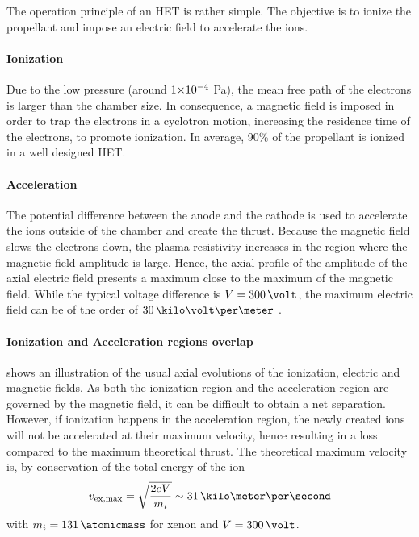   The operation principle of an \ac{HET} is rather simple.
  The objective is to ionize the propellant and impose an electric field to accelerate the ions.

  \paragraph{Ionization\\}
  Due to the low pressure (around ${{1}{\times}10^{-4}}$ Pa), the mean free path of the electrons is larger than the chamber size.
  In consequence, a magnetic field is imposed in order to trap the electrons in a cyclotron motion, increasing the residence time of the electrons, to promote  ionization.
  In average, 90\% of the propellant is ionized in a well designed \ac{HET}.

  \paragraph{Acceleration\\}
  The potential difference  between the anode and the cathode is used to accelerate the ions outside of the chamber and create the thrust.
  Because the magnetic field slows the electrons down, the plasma resistivity increases in the region where the magnetic field amplitude is large.
  Hence, the axial profile of the amplitude of the axial electric field presents a maximum close to the maximum of the magnetic field.
  While the typical voltage difference is $V=300\,\volt$, the maximum electric field can be of the order of $30\,\kilo\volt\per\meter$ \citep{gawron2008}.

  \paragraph{Ionization and Acceleration regions overlap\\}
   shows an illustration of the usual axial evolutions of the ionization, electric and magnetic fields.
  As both the ionization region and the acceleration region are governed by the magnetic field, it can be difficult to obtain a net separation.
  However, if ionization happens in the acceleration region, the newly created ions will not be accelerated at their maximum velocity, hence resulting in a loss compared to the maximum theoretical thrust.
  The theoretical maximum velocity is, by conservation of the total energy of the ion
  \begin{equation} \label{eq-vmaxtheo}
    v_{\rm ex, max} = \sqrt{ \frac{2 e V}{m_i} } \sim 31 \,\kilo\meter\per\second
  \end{equation}
  with $m_i = 131 \,\atomicmass$ for xenon and $V=300\,\volt$.


